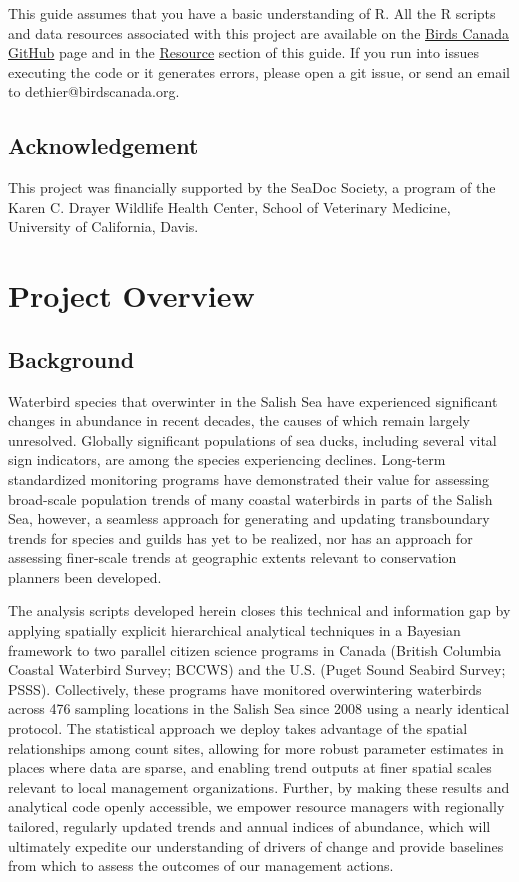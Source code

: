 \documentclass[
  letterpaper,
  DIV=11,
  numbers=noendperiod]{scrreprt}
\begin{document}
This guide assumes that you have a basic understanding of R. All the R
scripts and data resources associated with this project are available on
the \href{https://github.com/BirdsCanada/SalishSeaTrends}{Birds Canada
GitHub} page and in the \hyperref[9.9BirdsCan]{Resource} section of this
guide. If you run into issues executing the code or it generates errors,
please open a git issue, or send an email to dethier@birdscanada.org.

\section{Acknowledgement}\label{0.3Intro}

This project was financially supported by the SeaDoc Society, a program
of the Karen C. Drayer Wildlife Health Center, School of Veterinary
Medicine, University of California, Davis.


\chapter{Project Overview}\label{project-overview}

\section{Background}\label{1.1Intro}

Waterbird species that overwinter in the Salish Sea have experienced
significant changes in abundance in recent decades, the causes of which
remain largely unresolved. Globally significant populations of sea
ducks, including several vital sign indicators, are among the species
experiencing declines. Long-term standardized monitoring programs have
demonstrated their value for assessing broad-scale population trends of
many coastal waterbirds in parts of the Salish Sea, however, a seamless
approach for generating and updating transboundary trends for species
and guilds has yet to be realized, nor has an approach for assessing
finer-scale trends at geographic extents relevant to conservation
planners been developed.

The analysis scripts developed herein closes this technical and
information gap by applying spatially explicit hierarchical analytical
techniques in a Bayesian framework to two parallel citizen science
programs in Canada (British Columbia Coastal Waterbird Survey; BCCWS)
and the U.S. (Puget Sound Seabird Survey; PSSS). Collectively, these
programs have monitored overwintering waterbirds across 476 sampling
locations in the Salish Sea since 2008 using a nearly identical
protocol. The statistical approach we deploy takes advantage of the
spatial relationships among count sites, allowing for more robust
parameter estimates in places where data are sparse, and enabling trend
outputs at finer spatial scales relevant to local management
organizations. Further, by making these results and analytical code
openly accessible, we empower resource managers with regionally
tailored, regularly updated trends and annual indices of abundance,
which will ultimately expedite our understanding of drivers of change
and provide baselines from which to assess the outcomes of our
management actions.
\end{document}
